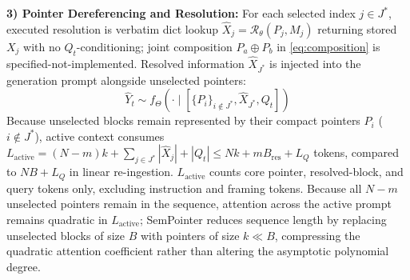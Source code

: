 \documentclass[conference]{IEEEtran}
\begin{document}
\noindent\textbf{3) Pointer Dereferencing and Resolution:}
For each selected index $j \in J^*$, executed resolution is verbatim dict lookup $\hat{X}_j = \mathcal{R}_{\theta}(P_j, M_j)$ returning stored $X_j$ with no $Q_t$-conditioning; joint composition $P_a \oplus P_b$ in \eqref{eq:composition} is specified-not-implemented. Resolved information $\hat{X}_{J^*}$ is injected into the generation prompt alongside unselected pointers:
\begin{equation}
\hat{Y}_t \sim f_{\Theta}\left(\cdot \mid [\{P_i\}_{i \notin J^*}, \hat{X}_{J^*}, Q_t]\right)
\end{equation}
Because unselected blocks remain represented by their compact pointers $P_i$ ($i \notin J^*$), active context consumes $L_{\mathrm{active}} = (N - m)k + \sum_{j \in J^*} |\hat{X}_j| + |Q_t| \le Nk + m B_{\mathrm{res}} + L_Q$ tokens, compared to $NB + L_Q$ in linear re-ingestion. $L_{\mathrm{active}}$ counts core pointer, resolved-block, and query tokens only, excluding instruction and framing tokens. Because all $N-m$ unselected pointers remain in the sequence, attention across the active prompt remains quadratic in $L_{\mathrm{active}}$; SemPointer reduces sequence length by replacing unselected blocks of size $B$ with pointers of size $k \ll B$, compressing the quadratic attention coefficient rather than altering the asymptotic polynomial degree.
\end{document}
